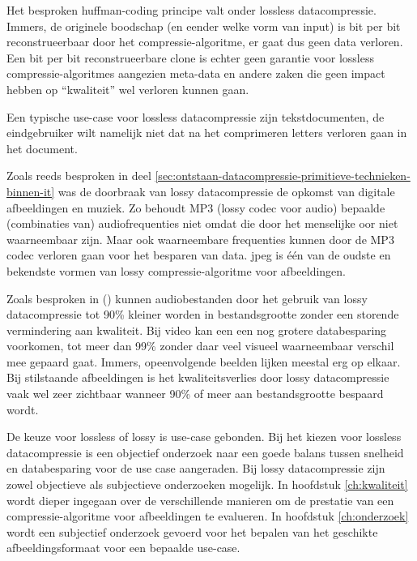 Het besproken \gls{huffman-coding} principe valt onder \gls{lossless} \gls{datacompressie}. Immers, de originele boodschap (en eender welke vorm van input) is bit per bit reconstrueerbaar door het \gls{compressie-algoritme}, er gaat dus geen data verloren. Een bit per bit reconstrueerbare clone is echter geen garantie voor \gls{lossless} \glspl{compressie-algoritme} aangezien \gls{meta-data} en andere zaken die geen impact hebben op “kwaliteit” wel verloren kunnen gaan.

Een typische \gls{use-case} voor \gls{lossless} \gls{datacompressie} zijn tekstdocumenten, de eindgebruiker wilt namelijk niet dat na het comprimeren letters verloren gaan in het document. 

Zoals reeds besproken in deel \ref{sec:ontstaan-datacompressie-primitieve-technieken-binnen-it} was de doorbraak van \gls{lossy} \gls{datacompressie} de opkomst van digitale afbeeldingen en muziek. Zo behoudt MP3 (\gls{lossy} \gls{codec} voor audio) bepaalde (combinaties van) audiofrequenties niet omdat die door het menselijke oor niet waarneembaar zijn. Maar ook waarneembare frequenties kunnen door de MP3 \gls{codec} verloren gaan voor het besparen van data. \gls{jpeg} is één van de oudste en bekendste vormen van \gls{lossy} \gls{compressie-algoritme} voor afbeeldingen. 

Zoals besproken in  (\cite{kaur2016}) kunnen audiobestanden door het gebruik van \gls{lossy} \gls{datacompressie} tot 90\% kleiner worden in bestandsgrootte zonder een storende vermindering aan kwaliteit. Bij video kan een een nog grotere databesparing voorkomen, tot meer dan 99\% zonder daar veel visueel waarneembaar verschil mee gepaard gaat. Immers, opeenvolgende beelden lijken meestal erg op elkaar. Bij stilstaande afbeeldingen is het kwaliteitsverlies door \gls{lossy} \gls{datacompressie} vaak wel zeer zichtbaar wanneer 90\% of meer aan bestandsgrootte bespaard wordt.

De keuze voor \gls{lossless} of \gls{lossy} is \gls{use-case} gebonden. Bij het kiezen voor \gls{lossless} \gls{datacompressie} is een objectief onderzoek naar een goede balans tussen snelheid en databesparing voor de use case aangeraden. Bij \gls{lossy} \gls{datacompressie} zijn zowel objectieve als subjectieve onderzoeken mogelijk. In hoofdstuk \ref{ch:kwaliteit} wordt dieper ingegaan over de verschillende manieren om de prestatie van een \gls{compressie-algoritme} voor afbeeldingen te evalueren. In hoofdstuk \ref{ch:onderzoek} wordt een subjectief onderzoek gevoerd voor het bepalen van het geschikte \gls{afbeeldingsformaat} voor een bepaalde \gls{use-case}.

